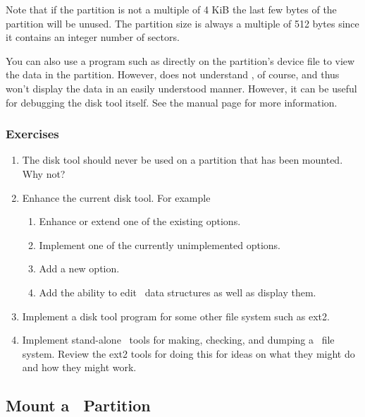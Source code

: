 Note that if the partition is not a multiple of 4 KiB the last few bytes of the partition will
be unused. The partition size is always a multiple of 512 bytes since it contains an integer
number of sectors.

You can also use a program such as  directly on the partition's device file to view
the data in the partition. However,  does not understand \GenericFS, of course, and
thus won't display the data in an easily understood manner. However, it can be useful for
debugging the disk tool itself. See the  manual page for more information.

\subsubsection*{Exercises}

\begin{enumerate}

\item The disk tool should never be used on a partition that has been mounted. Why not?

\item Enhance the current disk tool. For example

  \begin{enumerate}
    \item Enhance or extend one of the existing options.
    \item Implement one of the currently unimplemented options.
    \item Add a new option.
    \item Add the ability to edit \GenericFS\ data structures as well as
      display them.
  \end{enumerate}
  
\item Implement a disk tool program for some other file system such as ext2.

\item Implement stand-alone \GenericFS\ tools for making, checking, and dumping a \GenericFS\
  file system. Review the ext2 tools for doing this for ideas on what they might do and how they
  might work.

\end{enumerate}

\subsection{Mount a \GenericFS\ Partition}
\label{sec:implementation-mount}

